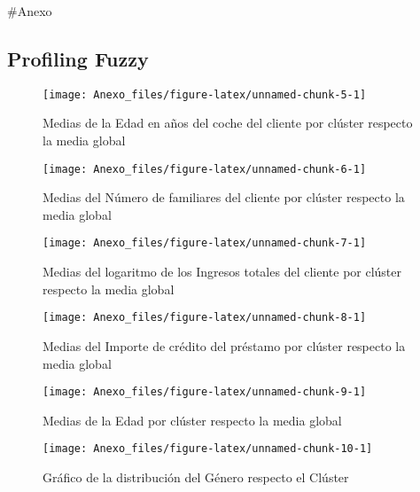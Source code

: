 \documentclass[
]{article}
\author{}
\date{\vspace{-2.5em}}
\begin{document}
\setlength{\headheight}{13.6pt}
\setlength{\topmargin}{-10mm}


\pagestyle{fancy}

\cfoot{\thepage}
\setcounter{page}{149}

\#Anexo

\hypertarget{profiling-fuzzy}{%
\subsection{Profiling Fuzzy}\label{profiling-fuzzy}}

\begin{figure}
\texttt{[image: Anexo\_files/figure-latex/unnamed-chunk-5-1]} \caption{Medias de la Edad en años del coche del cliente por clúster respecto la media global}\label{fig:unnamed-chunk-5}
\end{figure}

\begin{figure}
\texttt{[image: Anexo\_files/figure-latex/unnamed-chunk-6-1]} \caption{Medias del Número de familiares del cliente por clúster respecto la media global}\label{fig:unnamed-chunk-6}
\end{figure}

\begin{figure}
\texttt{[image: Anexo\_files/figure-latex/unnamed-chunk-7-1]} \caption{Medias del logaritmo de los Ingresos totales del cliente por clúster respecto la media global}\label{fig:unnamed-chunk-7}
\end{figure}

\begin{figure}
\texttt{[image: Anexo\_files/figure-latex/unnamed-chunk-8-1]} \caption{Medias del Importe de crédito del préstamo por clúster respecto la media global}\label{fig:unnamed-chunk-8}
\end{figure}

\begin{figure}
\texttt{[image: Anexo\_files/figure-latex/unnamed-chunk-9-1]} \caption{Medias de la Edad por clúster respecto la media global}\label{fig:unnamed-chunk-9}
\end{figure}

\begin{figure}
\texttt{[image: Anexo\_files/figure-latex/unnamed-chunk-10-1]} \caption{Gráfico de la distribución del Género respecto el Clúster}\label{fig:unnamed-chunk-10}
\end{figure}
\end{document}
